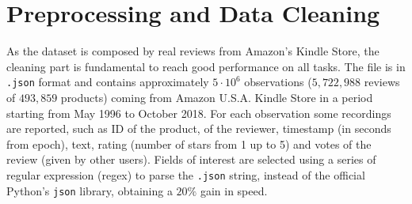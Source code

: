 \documentclass[fleqn,10pt]{SelfArx}
\begin{document}

\newpage
\section{Preprocessing and Data Cleaning}
As the dataset is composed by real reviews from Amazon's Kindle Store, the cleaning part is fundamental to reach good performance on all tasks.
The file is in \verb|.json| format and contains approximately $5 \cdot 10^6$ observations ($5,722,988$ reviews of $493,859$ products) coming from Amazon U.S.A. Kindle Store in a period starting from May 1996 to October 2018.
For each observation some recordings are reported, such as ID of the product, of the reviewer, timestamp (in seconds from epoch), text, rating (number of stars from 1 up to 5) and votes of the review (given by other users).
Fields of interest are selected using a series of regular expression (regex) to parse the \verb|.json| string, instead of the official Python's \verb|json| library, obtaining a $20\%$ gain in speed. \newline
\end{document}
